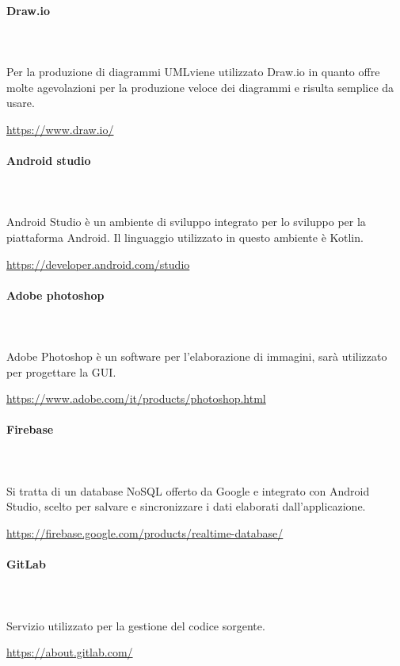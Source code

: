 		\paragraph{Draw.io} \mbox{}\\ \mbox{}\\
		Per la produzione di diagrammi UML\glosp viene utilizzato Draw.io in quanto offre molte agevolazioni per la produzione veloce dei diagrammi e risulta semplice da usare. \newline
		\centerline{\url{https://www.draw.io/}}
		\paragraph{Android studio} \mbox{}\\ \mbox{}\\
		Android Studio è un ambiente di sviluppo integrato per lo sviluppo per la piattaforma Android\glo. Il linguaggio utilizzato in questo ambiente è Kotlin\glo.
		 \newline
		\centerline{\url{https://developer.android.com/studio}}
		\paragraph{Adobe photoshop} \mbox{}\\ \mbox{}\\
		Adobe Photoshop è un software per l'elaborazione di immagini, sarà utilizzato per progettare la GUI\glo.
		\newline
		\centerline{\url{https://www.adobe.com/it/products/photoshop.html}}
		\paragraph{Firebase} \mbox{}\\ \mbox{}\\
		Si tratta di un database NoSQL offerto da Google e integrato con Android Studio, scelto per salvare e sincronizzare i dati elaborati dall'applicazione.
		\newline
		\centerline{\url{https://firebase.google.com/products/realtime-database/}}
		\paragraph{GitLab} \mbox{}\\ \mbox{}\\
		Servizio utilizzato per la gestione del codice sorgente.
		\newline
		\centerline{\url{https://about.gitlab.com/}}
		\begin{comment}
			\begin{figure}[H]
			\texttt{[image: res/images/""]}
			\caption{Software per la codifica}
			\end{figure} 
		\end{comment}

